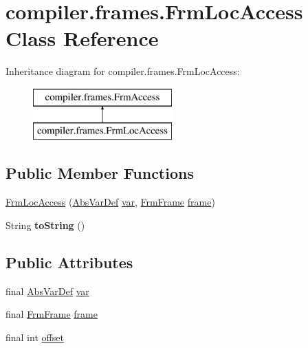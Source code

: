 \hypertarget{classcompiler_1_1frames_1_1_frm_loc_access}{}\section{compiler.\+frames.\+Frm\+Loc\+Access Class Reference}
\label{classcompiler_1_1frames_1_1_frm_loc_access}
Inheritance diagram for compiler.\+frames.\+Frm\+Loc\+Access\+:\begin{figure}[H]
\begin{center}
\leavevmode
\includegraphics[height=2.000000cm]{classcompiler_1_1frames_1_1_frm_loc_access}
\end{center}
\end{figure}
\subsection*{Public Member Functions}
\begin{DoxyCompactItemize}
\item 
\hyperlink{classcompiler_1_1frames_1_1_frm_loc_access_a74782b8f68a073bd99b83db745f457da}{Frm\+Loc\+Access} (\hyperlink{classcompiler_1_1abstr_1_1tree_1_1def_1_1_abs_var_def}{Abs\+Var\+Def} \hyperlink{classcompiler_1_1frames_1_1_frm_loc_access_a93b5f9ae202e1635fbbafc901fe8a2d3}{var}, \hyperlink{classcompiler_1_1frames_1_1_frm_frame}{Frm\+Frame} \hyperlink{classcompiler_1_1frames_1_1_frm_loc_access_abbd8912a1647b160319e9142426b4acf}{frame})
\item 
\mbox{\label{classcompiler_1_1frames_1_1_frm_loc_access_a1d15791deab44842638fb10cf9413bce}} 
String {\bfseries to\+String} ()
\end{DoxyCompactItemize}
\subsection*{Public Attributes}
\begin{DoxyCompactItemize}
\item 
final \hyperlink{classcompiler_1_1abstr_1_1tree_1_1def_1_1_abs_var_def}{Abs\+Var\+Def} \hyperlink{classcompiler_1_1frames_1_1_frm_loc_access_a93b5f9ae202e1635fbbafc901fe8a2d3}{var}
\item 
final \hyperlink{classcompiler_1_1frames_1_1_frm_frame}{Frm\+Frame} \hyperlink{classcompiler_1_1frames_1_1_frm_loc_access_abbd8912a1647b160319e9142426b4acf}{frame}
\item 
final int \hyperlink{classcompiler_1_1frames_1_1_frm_loc_access_a5bd0d3cfeda051f31fb6b0dca4c0577d}{offset}
\end{DoxyCompactItemize}


